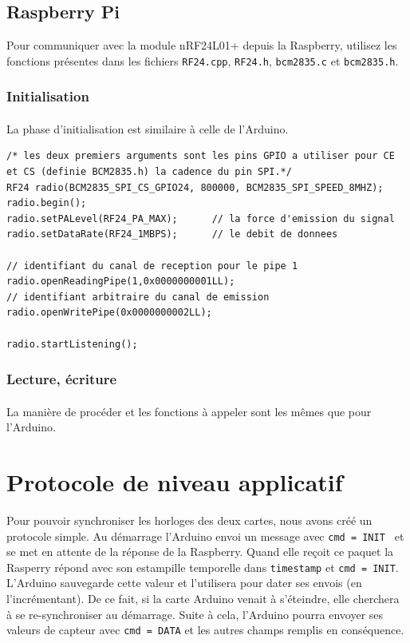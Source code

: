 \documentclass[a4paper, titlepage, oneside, 12pt]{article}%
\begin{document}
\subsection{Raspberry Pi}
Pour communiquer avec la module nRF24L01+ depuis la Raspberry, utilisez les fonctions présentes dans les fichiers \texttt{RF24.cpp}, \texttt{RF24.h}, \texttt{bcm2835.c} et \texttt{bcm2835.h}.

\subsubsection{Initialisation}
\paragraph{}
La phase d'initialisation est similaire à celle de l'Arduino. 

\begin{lstlisting}
/* les deux premiers arguments sont les pins GPIO a utiliser pour CE et CS (definie BCM2835.h) la cadence du pin SPI.*/
RF24 radio(BCM2835_SPI_CS_GPIO24, 800000, BCM2835_SPI_SPEED_8MHZ);
radio.begin();
radio.setPALevel(RF24_PA_MAX);		// la force d'emission du signal
radio.setDataRate(RF24_1MBPS);		// le debit de donnees

// identifiant du canal de reception pour le pipe 1
radio.openReadingPipe(1,0x0000000001LL);		
// identifiant arbitraire du canal de emission 
radio.openWritePipe(0x0000000002LL);

radio.startListening();
\end{lstlisting}

\subsubsection{Lecture, écriture}
\paragraph{}
La manière de procéder et les fonctions à appeler sont les mêmes que pour l'Arduino.

\section{Protocole de niveau applicatif}
Pour pouvoir synchroniser les horloges des deux cartes, nous avons créé un protocole simple.
Au démarrage l'Arduino envoi un message avec \texttt{cmd = INIT } et se met en attente de la réponse de la Raspberry. Quand elle reçoit ce paquet la Rasperry répond avec son estampille temporelle dans \texttt{timestamp} et \texttt{cmd = INIT}. L'Arduino sauvegarde cette valeur et l'utilisera pour dater ses envois (en l'incrémentant).
De ce fait, si la carte Arduino venait à s'éteindre, elle cherchera à se re-synchroniser au démarrage.
Suite à cela, l'Arduino pourra envoyer ses valeurs de capteur avec \texttt{cmd = DATA} et les autres champs remplis en conséquence.
\end{document}
